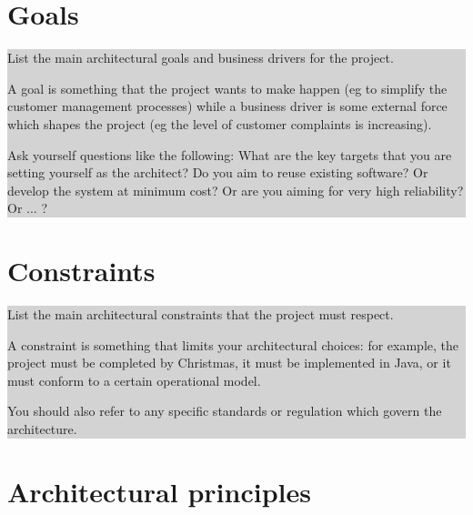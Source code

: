\documentclass[a4paper,11pt]{report}
\newcommand{\instructions}[1]{
  \noindent\colorbox{lightgray}{%
    \parbox{\linewidth}{%
      #1
    }%
  }%
 \vspace{0.1cm}
}
\begin{document}
\section{Goals}
\label{sec:goals}

\instructions{
List the main architectural goals and business drivers for the
project.

A goal is something that the project wants to make happen (eg to
simplify the customer management processes) while a business driver is
some external force which shapes the project (eg the level of customer
complaints is increasing).

Ask yourself questions like the following: What are the key targets
that you are setting yourself as the architect? Do you aim to reuse
existing software? Or develop the system at minimum cost? Or are you
aiming for very high reliability? Or ... ?
}

\section{Constraints}
\label{sec:constraints}

\instructions{
List the main architectural constraints that the project must respect.

A constraint is something that limits your architectural choices: for
example, the project must be completed by Christmas, it must be
implemented in Java, or it must conform to a certain operational
model.

You should also refer to any specific standards or regulation which
govern the architecture.
}
\section{Architectural principles}
\label{sec:arch-princ}
\end{document}
